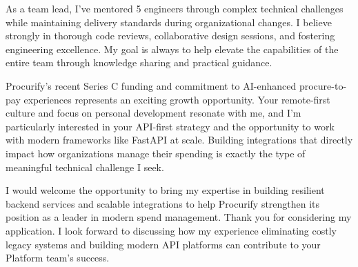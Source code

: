 \begin{storedcvletter}
{As a team lead, I've mentored 5 engineers through complex technical challenges while maintaining delivery standards during organizational changes. I believe strongly in thorough code reviews, collaborative design sessions, and fostering engineering excellence. My goal is always to help elevate the capabilities of the entire team through knowledge sharing and practical guidance.

Procurify's recent Series C funding and commitment to AI-enhanced procure-to-pay experiences represents an exciting growth opportunity. Your remote-first culture and focus on personal development resonate with me, and I'm particularly interested in your API-first strategy and the opportunity to work with modern frameworks like FastAPI at scale. Building integrations that directly impact how organizations manage their spending is exactly the type of meaningful technical challenge I seek.

I would welcome the opportunity to bring my expertise in building resilient backend services and scalable integrations to help Procurify strengthen its position as a leader in modern spend management. Thank you for considering my application. I look forward to discussing how my experience eliminating costly legacy systems and building modern API platforms can contribute to your Platform team's success.
}
\end{storedcvletter}

